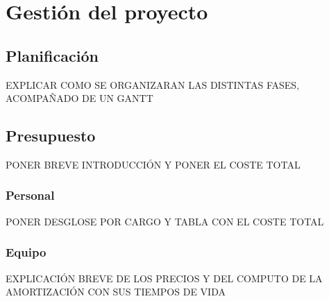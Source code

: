 \chapter{Gestión del proyecto}
\label{ch:gestion}
\section{Planificación}
EXPLICAR COMO SE ORGANIZARAN LAS DISTINTAS FASES, ACOMPAÑADO DE UN GANTT

\section{Presupuesto}
PONER BREVE INTRODUCCIÓN Y PONER EL COSTE TOTAL

\subsection{Personal}
PONER DESGLOSE POR CARGO Y TABLA CON EL COSTE TOTAL

\subsection{Equipo}
EXPLICACIÓN BREVE DE LOS PRECIOS Y DEL COMPUTO DE LA AMORTIZACIÓN CON SUS TIEMPOS DE VIDA\cite{electronic_lifetime}

